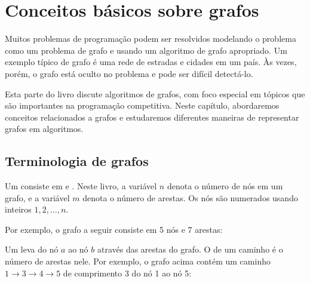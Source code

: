 \chapter{Conceitos básicos sobre grafos}

Muitos problemas de programação podem ser resolvidos modelando o problema como um problema de grafo e usando um algoritmo de grafo apropriado. Um exemplo típico de grafo é uma rede de estradas e cidades em um país. Às vezes, porém, o grafo está oculto no problema e pode ser difícil detectá-lo.

Esta parte do livro discute algoritmos de grafos, com foco especial em tópicos que são importantes na programação competitiva. Neste capítulo, abordaremos conceitos relacionados a grafos e estudaremos diferentes maneiras de representar grafos em algoritmos.

\section{Terminologia de grafos}


Um  consiste em  e . Neste livro, a variável $n$ denota o número de nós em um grafo, e a variável $m$ denota o número de arestas. Os nós são numerados usando inteiros $1,2,\ldots,n$.

Por exemplo, o grafo a seguir consiste em 5 nós e 7 arestas:

\begin{center}
\end{center}


Um  leva do nó $a$ ao nó $b$ através das arestas do grafo. O  de um caminho é o número de arestas nele. Por exemplo, o grafo acima contém um caminho $1 \rightarrow 3 \rightarrow 4 \rightarrow 5$ de comprimento 3 do nó 1 ao nó 5:

